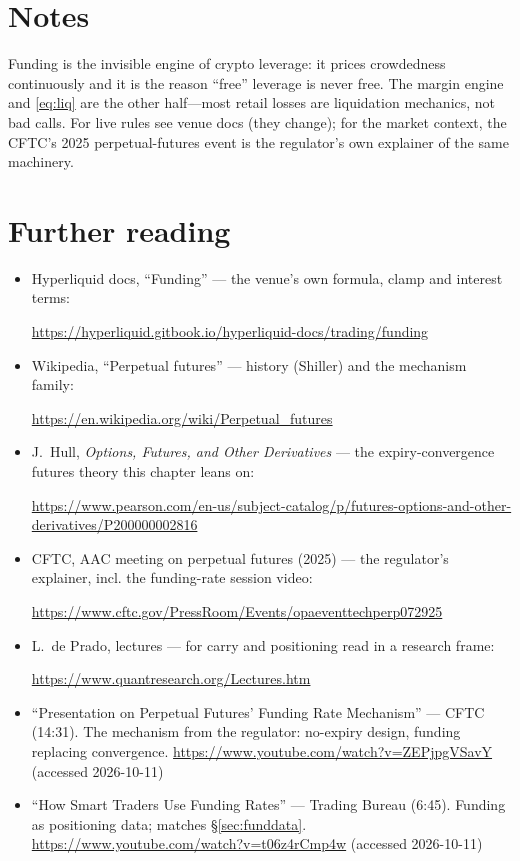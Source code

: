 \section*{Notes}
Funding is the invisible engine of crypto leverage: it prices crowdedness continuously and it
is the reason ``free'' leverage is never free. The margin engine and \eqref{eq:liq} are the
other half---most retail losses are liquidation mechanics, not bad calls. For live rules see
venue docs (they change); for the market context, the CFTC's 2025 perpetual-futures event is
the regulator's own explainer of the same machinery.

\section*{Further reading}
\begin{itemize}
\item Hyperliquid docs, ``Funding'' --- the venue's own formula, clamp and interest terms:

\url{https://hyperliquid.gitbook.io/hyperliquid-docs/trading/funding}
\item Wikipedia, ``Perpetual futures'' --- history (Shiller) and the mechanism family:

\url{https://en.wikipedia.org/wiki/Perpetual_futures}
\item J.\ Hull, \emph{Options, Futures, and Other Derivatives} --- the expiry-convergence
futures theory this chapter leans on:

\url{https://www.pearson.com/en-us/subject-catalog/p/futures-options-and-other-derivatives/P200000002816}
\item CFTC, AAC meeting on perpetual futures (2025) --- the regulator's explainer, incl. the
funding-rate session video:

\url{https://www.cftc.gov/PressRoom/Events/opaeventtechperp072925}
\item L.\ de Prado, lectures --- for carry and positioning read in a research frame:

\url{https://www.quantresearch.org/Lectures.htm}
\end{itemize}

\begin{rulebox}
\begin{itemize}
\item ``Presentation on Perpetual Futures' Funding Rate Mechanism'' --- CFTC (14:31). The
mechanism from the regulator: no-expiry design, funding replacing convergence.
\url{https://www.youtube.com/watch?v=ZEPjpgVSavY} (accessed 2026-10-11)
\item ``How Smart Traders Use Funding Rates'' --- Trading Bureau (6:45). Funding as
positioning data; matches \S\ref{sec:funddata}.
\url{https://www.youtube.com/watch?v=t06z4rCmp4w} (accessed 2026-10-11)
\end{itemize}
\end{rulebox}
